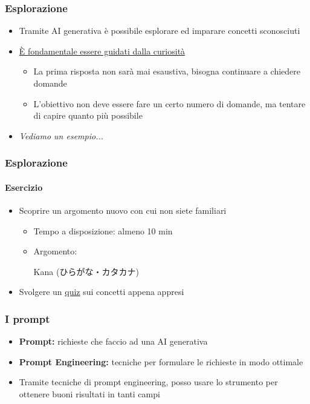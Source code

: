 \begin{contentframe}
    \frametitle{Esplorazione}

    \begin{itemize}
        \item Tramite AI generativa è possibile esplorare ed imparare concetti sconosciuti
        \item \underline{È fondamentale essere guidati dalla curiosità}
        \begin{itemize}
            \item La prima risposta non sarà mai esaustiva, bisogna continuare a chiedere domande
            \item L'obiettivo non deve essere fare un certo numero di domande, ma tentare di capire quanto più possibile
        \end{itemize}

        \bigskip
        \item \textit{Vediamo un esempio...}
    \end{itemize}
    
\end{contentframe}

\begin{exerciseframe}
    \frametitle{Esplorazione}
    \framesubtitle{Esercizio}

    \begin{itemize}
        \item Scoprire un argomento nuovo con cui non siete familiari
        \begin{itemize}
            \item Tempo a disposizione: almeno 10 min
            \item Argomento:\pause
                \begin{CJK}{UTF8}{min}
                    Kana (ひらがな・カタカナ)
                \end{CJK}
        \end{itemize}

        \pause
        \bigskip
        \item Svolgere un \href{https://play.blooket.com/host?id=67855de45130aefd0c2e869f}{quiz} sui concetti appena appresi
    \end{itemize}
\end{exerciseframe}


\begin{contentframe}
    \frametitle{I prompt}

    \begin{itemize}
        \item \textbf{Prompt:} richieste che faccio ad una AI generativa
        \item \textbf{Prompt Engineering:} tecniche per formulare le richieste in modo ottimale

        \bigskip
        \item Tramite tecniche di prompt engineering, posso usare lo strumento per ottenere buoni risultati in tanti campi 
    \end{itemize}
\end{contentframe}

